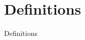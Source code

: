 \documentclass[12pt,a4paper]{article}
\begin{document}
\section{Definitions}
	{Definitions}
\end{document}

